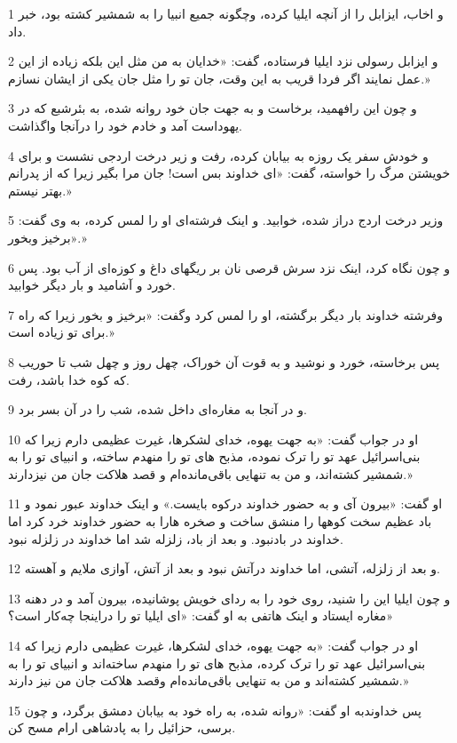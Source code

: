 \par 1 و اخاب، ایزابل را از آنچه ایلیا کرده، وچگونه جمیع انبیا را به شمشیر کشته بود، خبر داد.
\par 2 و ایزابل رسولی نزد ایلیا فرستاده، گفت: «خدایان به من مثل این بلکه زیاده از این عمل نمایند اگر فردا قریب به این وقت، جان تو را مثل جان یکی از ایشان نسازم.»
\par 3 و چون این رافهمید، برخاست و به جهت جان خود روانه شده، به بئرشبع که در یهوداست آمد و خادم خود را درآنجا واگذاشت.
\par 4 و خودش سفر یک روزه به بیابان کرده، رفت و زیر درخت اردجی نشست و برای خویشتن مرگ را خواسته، گفت: «ای خداوند بس است! جان مرا بگیر زیرا که از پدرانم بهتر نیستم.»
\par 5 وزیر درخت اردج دراز شده، خوابید. و اینک فرشته‌ای او را لمس کرده، به وی گفت: «برخیز وبخور.»
\par 6 و چون نگاه کرد، اینک نزد سرش قرصی نان بر ریگهای داغ و کوزه‌ای از آب بود. پس خورد و آشامید و بار دیگر خوابید.
\par 7 وفرشته خداوند بار دیگر برگشته، او را لمس کرد وگفت: «برخیز و بخور زیرا که راه برای تو زیاده است.»
\par 8 پس برخاسته، خورد و نوشید و به قوت آن خوراک، چهل روز و چهل شب تا حوریب که کوه خدا باشد، رفت.
\par 9 و در آنجا به مغاره‌ای داخل شده، شب را در آن بسر برد.
\par 10 او در جواب گفت: «به جهت یهوه، خدای لشکرها، غیرت عظیمی دارم زیرا که بنی‌اسرائیل عهد تو را ترک نموده، مذبح های تو را منهدم ساخته، و انبیای تو را به شمشیر کشته‌اند، و من به تنهایی باقی‌مانده‌ام و قصد هلاکت جان من نیزدارند.»
\par 11 او گفت: «بیرون آی و به حضور خداوند درکوه بایست.» و اینک خداوند عبور نمود و باد عظیم سخت کوهها را منشق ساخت و صخره هارا به حضور خداوند خرد کرد اما خداوند در بادنبود. و بعد از باد، زلزله شد اما خداوند در زلزله نبود.
\par 12 و بعد از زلزله، آتشی، اما خداوند درآتش نبود و بعد از آتش، آوازی ملایم و آهسته.
\par 13 و چون ایلیا این را شنید، روی خود را به ردای خویش پوشانیده، بیرون آمد و در دهنه مغاره ایستاد و اینک هاتفی به او گفت: «ای ایلیا تو را دراینجا چه‌کار است؟»
\par 14 او در جواب گفت: «به جهت یهوه، خدای لشکرها، غیرت عظیمی دارم زیرا که بنی‌اسرائیل عهد تو را ترک کرده، مذبح های تو را منهدم ساخته‌اند و انبیای تو را به شمشیر کشته‌اند و من به تنهایی باقی‌مانده‌ام وقصد هلاکت جان من نیز دارند.» 
\par 15 پس خداوندبه او گفت: «روانه شده، به راه خود به بیابان دمشق برگرد، و چون برسی، حزائیل را به پادشاهی ارام مسح کن.
